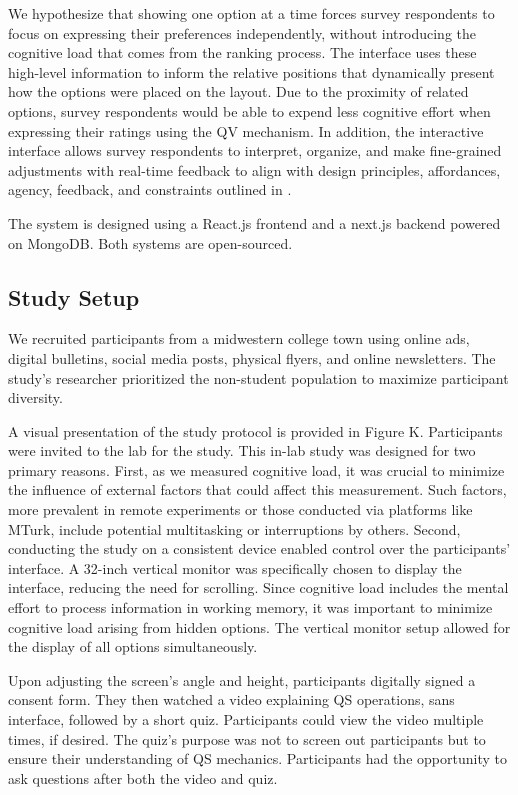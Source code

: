 We hypothesize that showing one option at a time forces survey respondents to focus on expressing their preferences independently, without introducing the cognitive load that comes from the ranking process. The interface uses these high-level information to inform the relative positions that dynamically present how the options were placed on the layout. Due to the proximity of related options, survey respondents would be able to expend less cognitive effort when expressing their ratings using the QV mechanism. In addition, the interactive interface allows survey respondents to interpret, organize, and make fine-grained adjustments with real-time feedback to align with design principles, affordances, agency, feedback, and constraints outlined in \cite{norman2013design}.

The system is designed using a React.js frontend and a next.js backend powered on MongoDB. Both systems are open-sourced.

\subsection{Study Setup}
We recruited participants from a midwestern college town using online ads, digital bulletins, social media posts, physical flyers, and online newsletters. The study's researcher prioritized the non-student population to maximize participant diversity.

A visual presentation of the study protocol is provided in Figure K. Participants were invited to the lab for the study. This in-lab study was designed for two primary reasons. First, as we measured cognitive load, it was crucial to minimize the influence of external factors that could affect this measurement. Such factors, more prevalent in remote experiments or those conducted via platforms like MTurk, include potential multitasking or interruptions by others. Second, conducting the study on a consistent device enabled control over the participants' interface. A 32-inch vertical monitor was specifically chosen to display the interface, reducing the need for scrolling. Since cognitive load includes the mental effort to process information in working memory, it was important to minimize cognitive load arising from hidden options. The vertical monitor setup allowed for the display of all options simultaneously.

Upon adjusting the screen's angle and height, participants digitally signed a consent form. They then watched a video explaining QS operations, sans interface, followed by a short quiz. Participants could view the video multiple times, if desired. The quiz's purpose was not to screen out participants but to ensure their understanding of QS mechanics. Participants had the opportunity to ask questions after both the video and quiz.

